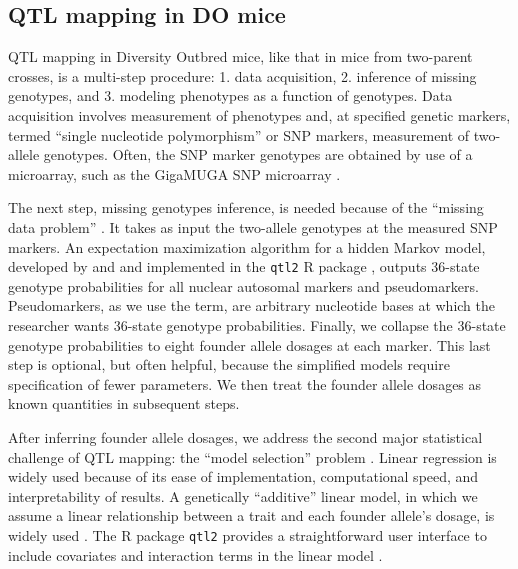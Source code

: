 \documentclass[]{article}\usepackage[]{graphicx}\usepackage[]{color}
\begin{document}
\subsection{QTL mapping in DO mice}

QTL mapping in Diversity Outbred mice, like that in mice from two-parent crosses, is a multi-step procedure: 1. data acquisition, 2. inference of missing genotypes, and 3. modeling phenotypes as a function of genotypes. Data acquisition involves measurement of phenotypes and, at specified genetic markers, termed ``single nucleotide polymorphism'' or SNP markers, measurement of two-allele genotypes. Often, the SNP marker genotypes are obtained by use of a microarray, such as the GigaMUGA SNP microarray \citep{morgan2015mouse}. 

The next step, missing genotypes inference, is needed because of the ``missing data problem'' \citep{broman2009guide}. It takes as input the two-allele genotypes at the measured SNP markers. An expectation maximization algorithm \citep{dempster1977maximum} for a hidden Markov model, developed by \citet{broman2012haplotype} and \citet{broman2012genotype} and implemented in the \texttt{qtl2} R package \citep{broman2019rqtl2}, outputs 36-state genotype probabilities for all nuclear autosomal markers and pseudomarkers. Pseudomarkers, as we use the term, are arbitrary nucleotide bases at which the researcher wants 36-state genotype probabilities. Finally, we collapse the 36-state genotype probabilities to eight founder allele dosages at each marker. This last step is optional, but often helpful, because the simplified models require specification of fewer parameters. We then treat the founder allele dosages as known quantities in subsequent steps. 


After inferring founder allele dosages, we address the second major statistical challenge of 
QTL mapping: the ``model selection'' problem \citep{broman2009guide}.
Linear regression is widely used because of its ease of implementation,
computational speed, and interpretability of results.
A genetically ``additive'' linear model, in which we assume a linear relationship between
a trait and each founder allele's dosage, is widely used 
\citep{gatti2014quantitative,broman2019rqtl2}.
The R package \texttt{qtl2} provides a straightforward user
interface to include covariates and interaction terms in the linear model \citep{broman2019rqtl2}.
\end{document}
